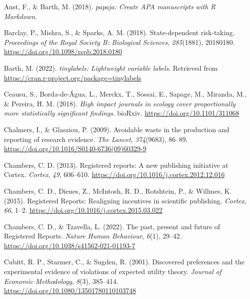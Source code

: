 \documentclass[
  ,man,mask,floatsintext]{apa6}
\newlength{\cslhangindent}
\newlength{\cslentryspacingunit} %
\newenvironment{CSLReferences}[2] %
 {%
  \setlength{\parindent}{0pt}
  \ifodd #1
  \let\oldpar\par
  \def\par{\hangindent=\cslhangindent\oldpar}
  \fi
  \setlength{\parskip}{#2\cslentryspacingunit}
 }%
 {}
\begin{document}
\begin{CSLReferences}{1}{0}
\leavevmode{}%
Aust, F., \& Barth, M. (2018). \emph{{papaja}: {Create APA} manuscripts with {R Markdown}}.

\leavevmode{}%
Barclay, P., Mishra, S., \& Sparks, A. M. (2018). State-dependent risk-taking. \emph{Proceedings of the Royal Society B: Biological Sciences}, \emph{285}(1881), 20180180. \url{https://doi.org/10.1098/rspb.2018.0180}

\leavevmode{}%
Barth, M. (2022). \emph{{tinylabels}: Lightweight variable labels}. Retrieved from \url{https://cran.r-project.org/package=tinylabels}

\leavevmode{}%
Ceausu, S., Borda-de-Água, L., Merckx, T., Sossai, E., Sapage, M., Miranda, M., \& Pereira, H. M. (2018). \emph{High impact journals in ecology cover proportionally more statistically significant findings}. bioRxiv. \url{https://doi.org/10.1101/311068}

\leavevmode{}%
Chalmers, I., \& Glasziou, P. (2009). Avoidable waste in the production and reporting of research evidence. \emph{The Lancet}, \emph{374}(9683), 86--89. \url{https://doi.org/10.1016/S0140-6736(09)60329-9}

\leavevmode{}%
Chambers, C. D. (2013). Registered reports: {A} new publishing initiative at {Cortex}. \emph{Cortex}, \emph{49}, 606--610. \url{https://doi.org/10.1016/j.cortex.2012.12.016}

\leavevmode{}%
Chambers, C. D., Dienes, Z., McIntosh, R. D., Rotshtein, P., \& Willmes, K. (2015). Registered {Reports}: {Realigning} incentives in scientific publishing. \emph{Cortex}, \emph{66}, 1--2. \url{https://doi.org/10.1016/j.cortex.2015.03.022}

\leavevmode{}%
Chambers, C. D., \& Tzavella, L. (2022). The past, present and future of {Registered Reports}. \emph{Nature Human Behaviour}, \emph{6}(1), 29--42. \url{https://doi.org/10.1038/s41562-021-01193-7}

\leavevmode{}%
Cubitt, R. P., Starmer, C., \& Sugden, R. (2001). Discovered preferences and the experimental evidence of violations of expected utility theory. \emph{Journal of Economic Methodology}, \emph{8}(3), 385--414. \url{https://doi.org/10.1080/13501780110103748}


\end{CSLReferences}
\end{document}
